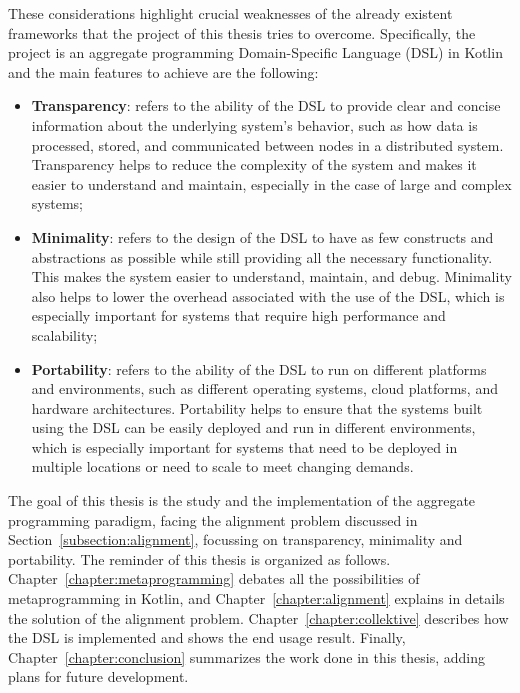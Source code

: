 These considerations highlight crucial weaknesses of the already existent frameworks that the project of this thesis tries to overcome. Specifically, the project is an aggregate programming Domain-Specific Language (DSL) in Kotlin and the main features to achieve are the following:
\begin{itemize}
    \item \textbf{Transparency}: refers to the ability of the DSL to provide clear and concise information about the underlying system's behavior, such as how data is processed, stored, and communicated between nodes in a distributed system. Transparency helps to reduce the complexity of the system and makes it easier to understand and maintain, especially in the case of large and complex systems;
    \item \textbf{Minimality}: refers to the design of the DSL to have as few constructs and abstractions as possible while still providing all the necessary functionality. This makes the system easier to understand, maintain, and debug. Minimality also helps to lower the overhead associated with the use of the DSL, which is especially important for systems that require high performance and scalability;
    \item \textbf{Portability}: refers to the ability of the DSL to run on different platforms and environments, such as different operating systems, cloud platforms, and hardware architectures. Portability helps to ensure that the systems built using the DSL can be easily deployed and run in different environments, which is especially important for systems that need to be deployed in multiple locations or need to scale to meet changing demands.
\end{itemize}

The goal of this thesis is the study and the implementation of the aggregate programming paradigm, facing the alignment problem discussed in Section~\ref{subsection:alignment}, focussing on transparency, minimality and portability.\newline
The reminder of this thesis is organized as follows. Chapter~\ref{chapter:metaprogramming} debates all the possibilities of metaprogramming in Kotlin, and Chapter~\ref{chapter:alignment} explains in details the solution of the alignment problem. Chapter~\ref{chapter:collektive} describes how the DSL is implemented and shows the end usage result. Finally, Chapter~\ref{chapter:conclusion} summarizes the work done in this thesis, adding plans for future development.

